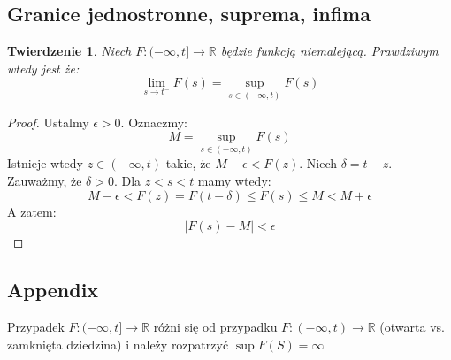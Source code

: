 \documentclass{article}
\newtheorem*{theorem}{Twierdzenie}
\begin{document}
\subsection*{Granice jednostronne, suprema, infima}

\begin{theorem}
    Niech \(F: (-\infty, t] \rightarrow \mathbb{R}\) będzie funkcją niemalejącą. Prawdziwym wtedy jest że:
    \begin{equation*}
        \lim_{s \to t^{-}} F(s) = \sup_{s \in (-\infty, t)} F(s)
    \end{equation*}
\end{theorem}
\begin{proof}
    Ustalmy \(\epsilon > 0\). Oznaczmy:
    \begin{equation*}
        M = \sup_{s \in (-\infty, t)} F(s)
    \end{equation*}
    Istnieje wtedy \(z \in (-\infty, t)\) takie, że \(M - \epsilon < F(z)\). Niech \(\delta = t - z\). Zauważmy,
    że \(\delta > 0\). Dla \(z < s < t\) mamy wtedy:
    \begin{equation*}
        M - \epsilon < F(z) = F(t - \delta) \leq F(s) \leq M < M + \epsilon
    \end{equation*}
    A zatem:
    \begin{equation*}
        |F(s) - M| < \epsilon
    \end{equation*}
\end{proof}

\subsection*{Appendix}
Przypadek \(F: (-\infty, t] \rightarrow \mathbb{R}\) różni się od przypadku
\(F: (-\infty, t) \rightarrow \mathbb{R}\) (otwarta vs. zamknięta dziedzina) i należy rozpatrzyć
\(\sup F(S) = \infty \)
\end{document}
